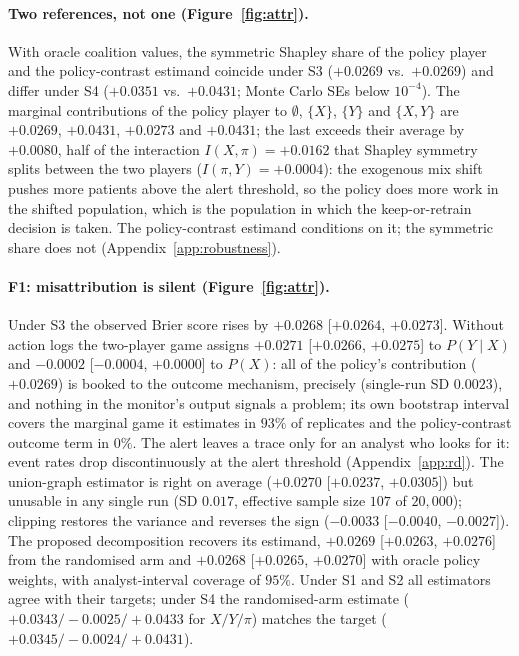 \documentclass[letterpaper]{article} %
\begin{document}
\paragraph{Two references, not one (Figure~\ref{fig:attr}).} With oracle
coalition values, the symmetric Shapley share of the policy player and the
policy-contrast estimand coincide under S3 ($+0.0269$ vs.\ $+0.0269$) and
differ under S4 ($+0.0351$ vs.\ $+0.0431$; Monte Carlo SEs below $10^{-4}$).
The marginal contributions of the policy player to $\emptyset$, $\{X\}$,
$\{Y\}$ and $\{X, Y\}$ are $+0.0269$, $+0.0431$, $+0.0273$ and $+0.0431$;
the last exceeds their average by $+0.0080$, half of the interaction
$I(X, \pi) = +0.0162$ that Shapley symmetry splits between the two players
($I(\pi, Y) = +0.0004$): the exogenous mix shift pushes more patients above
the alert threshold, so the policy does more work in the shifted population, which is
the population in which the keep-or-retrain decision is taken. The
policy-contrast estimand conditions on it; the symmetric share does not
(Appendix~\ref{app:robustness}).

\paragraph{F1: misattribution is silent (Figure~\ref{fig:attr}).} Under S3 the
observed Brier score rises by $+0.0268$ [$+0.0264$, $+0.0273$]. Without action
logs the two-player game assigns $+0.0271$ [$+0.0266$, $+0.0275$] to
$P(Y \mid X)$ and $-0.0002$ [$-0.0004$, $+0.0000$] to $P(X)$: all of the
policy's contribution ($+0.0269$) is booked to the outcome mechanism,
precisely (single-run SD $0.0023$), and nothing in the monitor's output
signals a problem; its own bootstrap interval covers the marginal game it
estimates in $93\%$ of replicates and the policy-contrast outcome term in
$0\%$. The alert leaves a trace only for an analyst who looks for it: event
rates drop discontinuously at the alert threshold (Appendix~\ref{app:rd}).
The union-graph estimator is right on average ($+0.0270$ [$+0.0237$,
$+0.0305$]) but unusable in any single run (SD $0.017$, effective sample size
$107$ of $20{,}000$); clipping restores the variance and reverses the sign
($-0.0033$ [$-0.0040$, $-0.0027$]). The proposed decomposition recovers its
estimand, $+0.0269$ [$+0.0263$, $+0.0276$] from the randomised arm and
$+0.0268$ [$+0.0265$, $+0.0270$] with oracle policy weights, with
analyst-interval coverage of $95\%$. Under S1 and S2 all estimators agree with
their targets; under S4 the
randomised-arm estimate ($+0.0343 / -0.0025 / +0.0433$ for $X / Y / \pi$)
matches the target ($+0.0345 / -0.0024 / +0.0431$).
\end{document}
